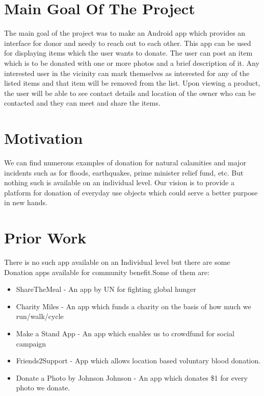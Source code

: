\documentclass[12pt, a4paper]{article}
\begin{document}
\titlpage
\newpage
\tableofcontents
\newpage


\section{\textbf{Main Goal Of The Project}}
The main goal of the project was to make an Android app which provides an interface for donor and needy to reach out to each other. This app can be used for displaying items which the user wants to donate. The user can post an item which is to be donated with one or more photos and a brief description of it. Any interested user in the vicinity can mark themselves as interested for any of the listed items and that item will be removed from the list. Upon viewing a product, the user will be able to see contact details and location of the owner who can be contacted and they can meet and share the items.

\section{\textbf{Motivation}}
We can find numerous examples of donation for natural calamities and major incidents such as for floods, earthquakes, prime minister relief fund, etc. But nothing such is available on an individual level. Our vision is to provide a platform for donation of everyday use objects which could serve a better purpose in new hands.


\section{\textbf{Prior Work}}
 There is no such app available on an Individual level but there are some Donation apps available for community benefit.Some of them are:
 \begin{itemize}
     \item ShareTheMeal - An app by UN for fighting global hunger
     \item Charity Miles - An app which funds a charity on the basis of how much we run/walk/cycle
     \item Make a Stand App - An app which enables us to crowdfund for social campaign
     \item Friends2Support - App which allows location based voluntary blood donation.
    \item Donate a Photo by Johnson Johnson - An app which donates \$1 for every photo we donate.

 \end{itemize}
\newpage
\end{document}
